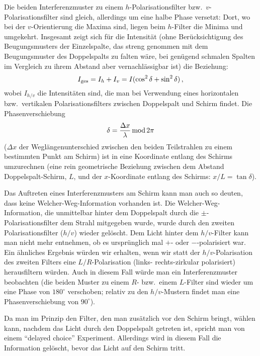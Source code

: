Die beiden Interferenzmuster zu einem $h$-Polarisationsfilter bzw.\ $v$-Polarisationsfilter
sind gleich, allerdings um eine halbe Phase versetzt:
Dort, wo bei der $v$-Orientierung die Maxima sind, liegen beim $h$-Filter die Minima und
umgekehrt. Insgesamt zeigt sich f\"ur die Intensit\"at (ohne Ber\"ucksichtigung des Beugungsmusters
der Einzelspalte, das streng genommen mit dem Beugungsmuster des Doppelspalts zu falten w\"are,
bei gen\"ugend schmalen Spalten im Vergleich zu ihrem Abstand aber vernachl\"assigbar ist) 
die Beziehung:
\begin{equation}
              I_{\rm ges} =   I_h + I_v = I ( \cos^2 \delta + \sin^2 \delta)   \, ,
\end{equation}
wobei $I_{h/v}$ die Intensit\"aten sind, die man bei Verwendung eines horizontalen bzw.\
vertikalen Polarisationsfilters zwischen Doppelspalt und Schirm findet. Die Phasenverschiebung
\begin{equation}
        \delta = \frac{\Delta x}{\lambda} \, {\rm mod}\, 2\pi
\end{equation}
($\Delta x$ der Wegl\"angenunterschied zwischen den beiden Teilstrahlen zu einem
bestimmten Punkt am Schirm) 
ist in eine Koordinate entlang des Schirms umzurechnen (eine rein geometrische
Beziehung zwischen dem Abstand Doppelspalt-Schirm, $L$, und der $x$-Koordinate entlang des 
Schirms: $x/L=\tan \delta$). 

Das Auftreten eines Interferenzmusters am Schirm kann man auch so deuten, dass keine
\glqq Welcher-Weg\grqq-Information vorhanden ist. Die \glqq Welcher-Weg\grqq-Information, die
unmittelbar hinter dem Doppelspalt durch die $\pm$-Polarisationsfilter dem Strahl mitgegeben
wurde, wurde durch den zweiten Polarisationsfilter ($h/v$) wieder gel\"oscht. Dem Licht hinter dem
$h/v$-Filter kann man nicht mehr entnehmen, ob es urspr\"unglich mal $+$- oder $-$-polarisiert war.
Ein \"ahnliches Ergebnis w\"urden wir erhalten, wenn wir statt der $h/v$-Polarisation des zweiten
Filters eine $L/R$-Polarisation (links- rechts-zirkular polarisiert) herausfiltern w\"urden. Auch in diesem
Fall w\"urde man ein Interferenzmuster beobachten (die beiden Muster zu einem $R$- bzw.\ einem 
$L$-Filter sind wieder um eine Phase von $180^\circ$ verschoben; relativ zu den $h/v$-Mustern findet
man eine Phasenverschiebung von $90^\circ$).

Da man im Prinzip den Filter, den man zus\"atzlich vor den Schirm bringt, w\"ahlen kann, nachdem
das Licht durch den Doppelspalt getreten ist, spricht man von einem ``delayed choice'' Experiment. 
Allerdings wird in diesem Fall die Information gel\"oscht, bevor das Licht auf den Schirm tritt. 

